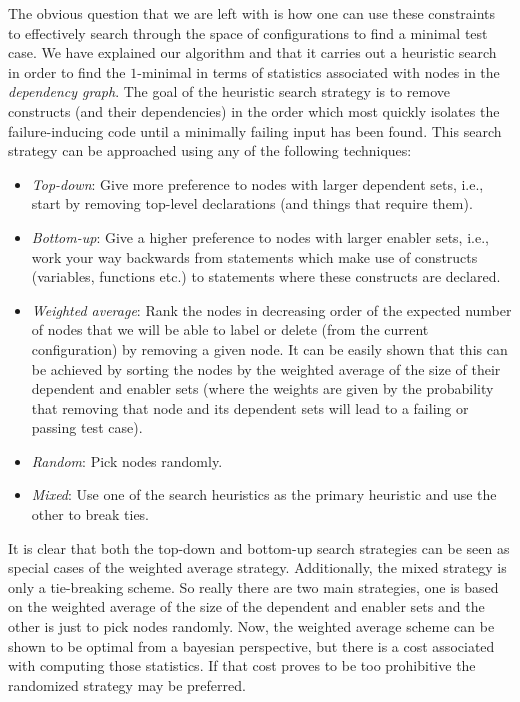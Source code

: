 \documentclass[preprint]{acm_proc_article-sp}
\begin{document}
The obvious question that we are left with is how one can use these constraints
to effectively search through the space of configurations to find a minimal test
case. We have explained our algorithm and that it carries out a heuristic search
in order to find the $1$-minimal in terms of statistics associated with nodes in
the \emph{dependency graph}. The goal of the heuristic search strategy is to
remove constructs (and their dependencies) in the order which most quickly
isolates the failure-inducing code until a minimally failing input has been
found. This search strategy can be approached using any of the following
techniques:
\begin{itemize}
\item \emph{Top-down}: Give more preference to nodes with larger dependent
  sets, i.e., start by removing top-level declarations (and things that
  require them).
\item \emph{Bottom-up}: Give a higher preference to nodes with larger enabler
  sets, i.e., work your way backwards from statements which make use of
  constructs (variables, functions etc.) to statements where these constructs
  are declared.
\item \emph{Weighted average}: Rank the nodes in decreasing order of the
  expected number of nodes that we will be able to label or delete (from the
  current configuration) by removing a given node. It can be easily shown that
  this can be achieved by sorting the nodes by the weighted average of the size
  of their dependent and enabler sets (where the weights are given by the
  probability that removing that node and its dependent sets will lead to a
  failing or passing test case).
\item \emph{Random}: Pick nodes randomly.
\item \emph{Mixed}: Use one of the search heuristics as the primary heuristic
  and use the other to break ties.
\end{itemize}

It is clear that both the top-down and bottom-up search strategies can be seen
as special cases of the weighted average strategy. Additionally, the mixed
strategy is only a tie-breaking scheme. So really there are two main strategies,
one is based on the weighted average of the size of the dependent and enabler
sets and the other is just to pick nodes randomly. Now, the weighted average
scheme can be shown to be optimal from a bayesian perspective, but there is a
cost associated with computing those statistics. If that cost proves to be too
prohibitive the randomized strategy may be preferred.
\end{document}
